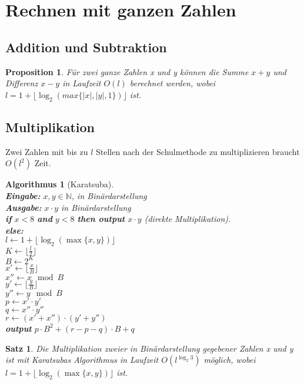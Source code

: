 \documentclass[12pt,a4paper]{article}
\theoremstyle{plain}
\newtheorem{Satz}[Theorem]{Satz}
\newtheorem{Prop}[Theorem]{Proposition}
\newtheorem{Algorithmus}[Theorem]{Algorithmus}
\newcommand{\N}{\mathbb{N}}
\numberwithin{equation}{section}
\begin{document}
\section{Rechnen mit ganzen Zahlen}
\subsection{Addition und Subtraktion}
\begin{Prop}
Für zwei ganze Zahlen x und y können die Summe $x+y$ und Differenz $x-y$ in Laufzeit $O(l)$ berechnet werden, wobei $l=1+\lfloor \log_2(max\{|x|,|y|,1\})\rfloor$ ist.
\end{Prop}
\subsection{Multiplikation}
Zwei Zahlen mit bis zu $l$ Stellen nach der Schulmethode zu multiplizieren braucht $O(l^2)$ Zeit.
\begin{Algorithmus}[Karatsuba]\\
\textbf{Eingabe:} $x,y \in \N$, in Binärdarstellung\\
\textbf{Ausgabe:} $x\cdot y$ in Binärdarstellung\\
\textbf{if} $x<8$ \textbf{and} $y<8$ \textbf{then output} $x\cdot y$ (direkte Multiplikation).\\
\textbf{else:}\\
\text{\qquad}$l \leftarrow 1+ \lfloor \log_2 (\max\{x,y\})\rfloor$\\
\text{\qquad}$K \leftarrow \lfloor \frac{l}{2} \rfloor$ \\
\text{\qquad}$B \leftarrow 2^K$\\
\text{\qquad}$x' \leftarrow \lfloor\frac{x}{B} \rfloor$\\
\text{\qquad}$x'' \leftarrow x\mod B$\\
\text{\qquad}$y' \leftarrow \lfloor\frac{y}{B} \rfloor$\\
\text{\qquad}$y'' \leftarrow y\mod B$\\
\text{\qquad}$p \leftarrow x'\cdot y'$\\
\text{\qquad}$q \leftarrow x''\cdot y''$\\
\text{\qquad}$ r\leftarrow (x'+x'')\cdot (y'+y'')$\\
\text{\qquad}\textbf{output} $p\cdot B^2+(r-p-q)\cdot B+q$
\end{Algorithmus}
\begin{Satz}
Die Multiplikation zweier in Binärdarstellung gegebener Zahlen x und y ist mit \mbox{Karatsubas} Algorithmus in Laufzeit $O(l^{\log_2 3})$ möglich, wobei $l=1+\lfloor\log_2(\max\{x,y\})\rfloor$ ist.
\end{Satz}
\end{document}
